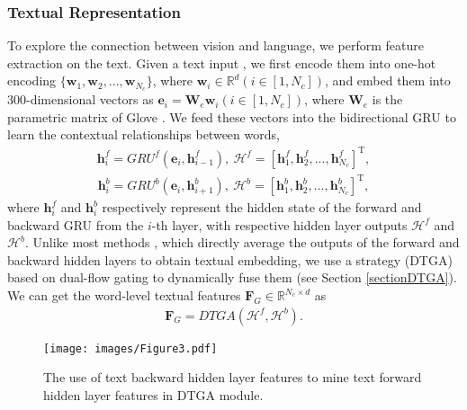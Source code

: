 \documentclass[journal]{IEEEtran}
\begin{document}
\subsubsection{Textual Representation}
To explore the connection between vision and language, we perform feature extraction on the text. Given a text input , we first encode them into one-hot encoding $\{\bm{w}_1, \bm{w}_2,...,\bm{w}_{N_c}\}$, where $\bm{w}_i \in \mathbb{R}^{d}(i \in[1,N_c])$, and embed them into 300-dimensional vectors as $\bm{e}_i  = \bm{W}_e\bm{w}_i(i \in[1,N_c])$, where $\bm{W}_e$ is the parametric matrix of Glove \cite{pennington2014glove}. We feed these vectors into the bidirectional GRU \cite{chung2014empirical} to learn the contextual relationships between words,
\begin{equation}
\begin{aligned}
\bm{h}_i^f =G R U^f\left(\bm{e}_i, \bm{h}_{i-1}^f\right), \ \bm{\mathcal{H}}^f = [\bm{h}_1^f, \bm{h}_2^f,..., \bm{h}_{N_c}^f]^{\mathrm{T}},
\end{aligned}
\end{equation}
\begin{equation}
\begin{aligned}
\bm{h}_i^b =G R U^b\left(\bm{e}_i, \bm{h}_{i+1}^b\right), \ \bm{\mathcal{H}}^b = [\bm{h}_1^b, \bm{h}_2^b,..., \bm{h}_{N_c}^b]^{\mathrm{T}},
\end{aligned}
\end{equation}
where $\bm{h}_i^f$ and $\bm{h}_i^b$ respectively represent the hidden state of the forward and backward GRU from the $i$-th layer, with respective hidden layer outputs $\bm{\mathcal{H}}^f$ and $\bm{\mathcal{H}}^b$. Unlike most methods \cite{ji2019saliency, zhang2020context, yuan2022remote, pan2023reducing}, which directly average the outputs of the forward and backward hidden layers to obtain textual embedding, we use a strategy (DTGA) based on dual-flow gating to dynamically fuse them (see Section \ref{sectionDTGA}). We can get the word-level textual features $\bm{F}_G \in \mathbb{R}^{N_c \times d}$ as
\begin{equation}
\begin{aligned}
\bm{F}_G =D T G A\left(\bm{\mathcal{H}}^f, \bm{\mathcal{H}}^b\right).
\end{aligned}
\end{equation}
\begin{figure}[t]
  \centering
  \texttt{[image: images/Figure3.pdf]}
  \caption{The use of text backward hidden layer features to mine text forward hidden layer features in DTGA module.}
  \label{fig:fig3}
\end{figure}
\end{document}
